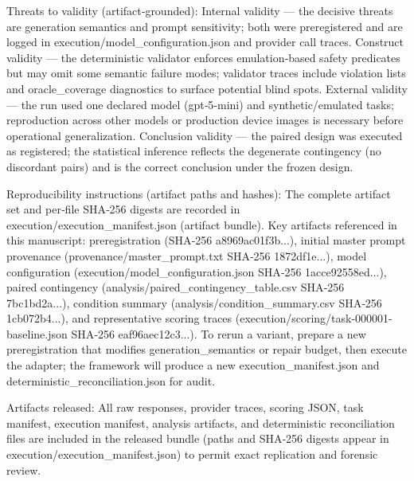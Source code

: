 \documentclass[conference]{IEEEtran}
\begin{document}
Threats to validity (artifact‑grounded): Internal validity --- the decisive threats are generation semantics and prompt sensitivity; both were preregistered and are logged in execution/model\_configuration.json and provider call traces. Construct validity --- the deterministic validator enforces emulation‑based safety predicates but may omit some semantic failure modes; validator traces include violation lists and oracle\_coverage diagnostics to surface potential blind spots. External validity --- the run used one declared model (gpt‑5‑mini) and synthetic/emulated tasks; reproduction across other models or production device images is necessary before operational generalization. Conclusion validity --- the paired design was executed as registered; the statistical inference reflects the degenerate contingency (no discordant pairs) and is the correct conclusion under the frozen design.

Reproducibility instructions (artifact paths and hashes): The complete artifact set and per‑file SHA‑256 digests are recorded in execution/execution\_manifest.json (artifact bundle). Key artifacts referenced in this manuscript: preregistration (SHA‑256 a8969ac01f3b...), initial master prompt provenance (provenance/master\_prompt.txt SHA‑256 1872df1e...), model configuration (execution/model\_configuration.json SHA‑256 1acce92558ed...), paired contingency (analysis/paired\_contingency\_table.csv SHA‑256 7bc1bd2a...), condition summary (analysis/condition\_summary.csv SHA‑256 1cb072b4...), and representative scoring traces (execution/scoring/task-000001-baseline.json SHA‑256 eaf96aec12c3...). To rerun a variant, prepare a new preregistration that modifies generation\_semantics or repair budget, then execute the adapter; the framework will produce a new execution\_manifest.json and deterministic\_reconciliation.json for audit.

Artifacts released: All raw responses, provider traces, scoring JSON, task manifest, execution manifest, analysis artifacts, and deterministic reconciliation files are included in the released bundle (paths and SHA‑256 digests appear in execution/execution\_manifest.json) to permit exact replication and forensic review.
\end{document}
